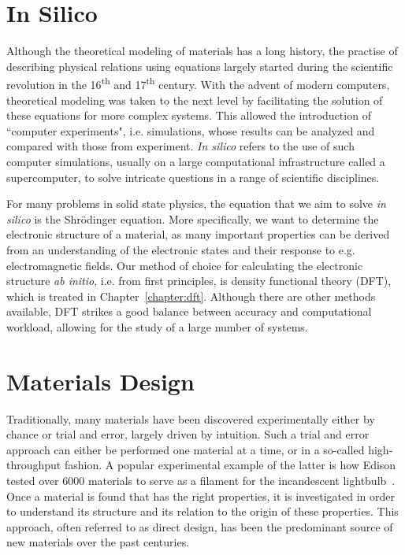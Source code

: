 \begin{refsection}
\newpage
\section{In Silico} \label{intro:sec-in_silico}

Although the theoretical modeling of materials has a long history, the practise 
of describing physical relations using equations largely started during the 
scientific revolution in the 16\textsuperscript{th} and 17\textsuperscript{th} 
century. With the advent of modern computers, theoretical modeling was taken 
to the next level by facilitating the solution of these equations for more 
complex systems. This allowed the introduction of ``computer experiments", i.e. 
simulations, whose results can be analyzed and compared with those from 
experiment. \textit{In silico} refers to the use of such computer simulations, 
usually on a large computational infrastructure called a supercomputer, to 
solve intricate questions in a range of scientific disciplines. 

For many problems in solid state physics, the equation that we aim to solve 
\textit{in silico} is the Shr\"odinger equation. More specifically, we want 
to determine the electronic structure of a material, as many important 
properties can be derived from an understanding of the electronic states and 
their response to e.g. electromagnetic fields. Our method of choice for 
calculating the electronic structure \textit{ab initio}, i.e. from 
first principles, is density functional theory (DFT), which is treated in 
Chapter~\ref{chapter:dft}. Although there are other methods available, DFT 
strikes a good balance between accuracy and computational workload, allowing 
for the study of a large number of systems.

\section{Materials Design} \label{intro:sec-materials_design}

Traditionally, many materials have been discovered experimentally either by 
chance or trial and error, largely driven by intuition. Such a trial and error 
approach can either be performed one material at a time, or in a so-called 
high-throughput fashion. A popular experimental example of the latter is how 
Edison tested over 6000 materials to serve as a filament for the incandescent 
lightbulb~\cite{E.1918}. Once a material is found that has the right properties, 
it is investigated in order to understand its structure and its relation to the 
origin of these properties. This approach, often referred to as direct design, 
has been the predominant source of new materials over the past centuries.


\end{refsection}
